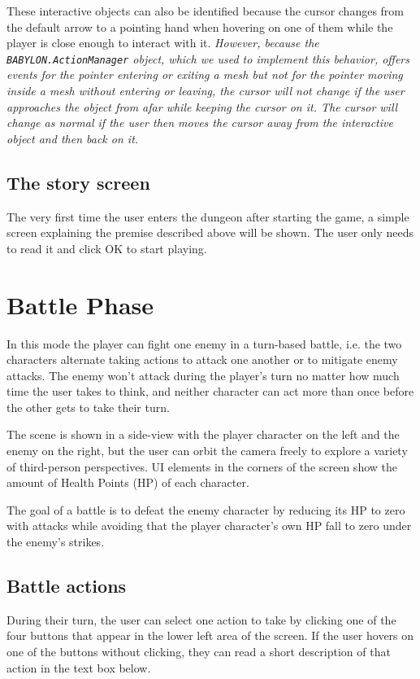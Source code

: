 These interactive objects can also be identified because the cursor changes from the default arrow to a pointing hand when hovering on one of them while the player is close enough to interact with it. \textit{However, because the \texttt{BABYLON.ActionManager} object, which we used to implement this behavior, offers events for the pointer entering or exiting a mesh but not for the pointer moving inside a mesh without entering or leaving, the cursor will not change if the user approaches the object from afar while keeping the cursor on it. The cursor will change as normal if the user then moves the cursor away from the interactive object and then back on it.}

\subsection{The story screen}

The very first time the user enters the dungeon after starting the game, a simple screen explaining the premise described above will be shown. The user only needs to read it and click OK to start playing.

\section{Battle Phase}

In this mode the player can fight one enemy in a turn-based battle, i.e. the two characters alternate taking actions to attack one another or to mitigate enemy attacks. The enemy won't attack during the player's turn no matter how much time the user takes to think, and neither character can act more than once before the other gets to take their turn.

The scene is shown in a side-view with the player character on the left and the enemy on the right, but the user can orbit the camera freely to explore a variety of third-person perspectives. UI elements in the corners of the screen show the amount of Health Points (HP) of each character.

The goal of a battle is to defeat the enemy character by reducing its HP to zero with attacks while avoiding that the player character's own HP fall to zero under the enemy's strikes.

\subsection{Battle actions}

During their turn, the user can select one action to take by clicking one of the four buttons that appear in the lower left area of the screen. If the user hovers on one of the buttons without clicking, they can read a short description of that action in the text box below.

